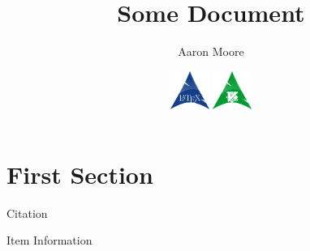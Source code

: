 \documentclass[a4paper]{article}
\title{Some Document}
\author{Aaron Moore}
\date{\includegraphics[width=1.25cm]{arch-latex_logo}
\includegraphics[width=1.25cm]{arch-vim_logo}}
\begin{document}
\maketitle
\section{First Section}
Citation \cite{itemid}

\pagebreak{}
\begin{thebibliography}{9}
		Item Information

\end{thebibliography}
\end{document}
